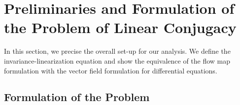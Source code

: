 \documentclass{amsart}
\theoremstyle{plain}
\theoremstyle{definition}
\newtheorem{remark}[theorem]{Remark}
\begin{document}














\section{Preliminaries and Formulation of the Problem of Linear Conjugacy}\label{prelim}

In this section, we precise the overall set-up for our analysis. We define the invariance-linearization equation and show the equivalence of the flow map formulation with the vector field formulation for differential equations. 



\subsection{Formulation of the Problem}
\end{document}
